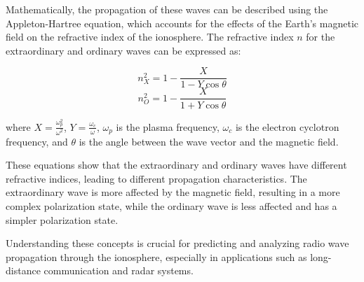 Mathematically, the propagation of these waves can be described using the Appleton-Hartree equation, which accounts for the effects of the Earth's magnetic field on the refractive index of the ionosphere. The refractive index \( n \) for the extraordinary and ordinary waves can be expressed as:

\[
n_X^2 = 1 - \frac{X}{1 - Y \cos \theta}
\]
\[
n_O^2 = 1 - \frac{X}{1 + Y \cos \theta}
\]

where \( X = \frac{\omega_p^2}{\omega^2} \), \( Y = \frac{\omega_c}{\omega} \), \( \omega_p \) is the plasma frequency, \( \omega_c \) is the electron cyclotron frequency, and \( \theta \) is the angle between the wave vector and the magnetic field.

These equations show that the extraordinary and ordinary waves have different refractive indices, leading to different propagation characteristics. The extraordinary wave is more affected by the magnetic field, resulting in a more complex polarization state, while the ordinary wave is less affected and has a simpler polarization state.

Understanding these concepts is crucial for predicting and analyzing radio wave propagation through the ionosphere, especially in applications such as long-distance communication and radar systems.

